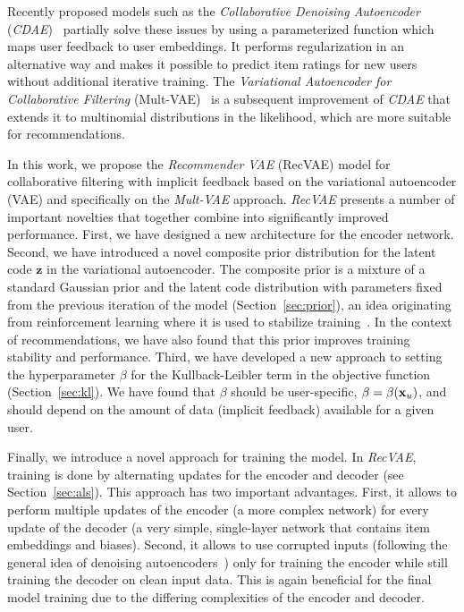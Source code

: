 \documentclass[sigconf,authorversion]{acmart}
\def\x{{\bf x}}
\def\bz{{\bf z}}
\def\bz{\boldsymbol{z}}
\begin{document}
Recently proposed models such as the \emph{Collaborative Denoising Autoencoder} (\emph{CDAE})~\cite{wu2016collaborative} partially solve these issues by using a parameterized function which maps user feedback to user embeddings. It performs regularization in an alternative way and makes it possible to predict item ratings for new users without additional iterative training. The \emph{Variational Autoencoder for Collaborative Filtering} (Mult-VAE)~\cite{liang2018variational} is a subsequent improvement of \emph{CDAE} that extends it to multinomial distributions in the likelihood, which are more suitable for recommendations.

In this work, we propose the \emph{Recommender VAE} (RecVAE) model for collaborative filtering with implicit feedback based on the variational autoencoder (VAE) and specifically on the \emph{Mult-VAE} approach. \emph{RecVAE} presents a number of important novelties that together combine into significantly improved performance. First, we have designed a new architecture for the encoder network. Second, we have introduced a novel composite prior distribution for the latent code $\bz$ in the variational autoencoder. The composite prior is a mixture of a standard Gaussian prior and the latent code distribution with parameters fixed from the previous iteration of the model (Section~\ref{sec:prior}), an idea originating from reinforcement learning where it is used to stabilize training~\cite{DBLP:journals/corr/SchulmanWDRK17,houthooft2016vime}. In the context of recommendations, we have also found that this prior improves training stability and performance. Third, we have developed a new approach to setting the hyperparameter $\beta$ for the Kullback-Leibler term in the objective function (Section~\ref{sec:kl}). We have found that $\beta$ should be user-specific, $\beta=\beta(\x_u)$, and should depend on the amount of data (implicit feedback) available for a given user.

Finally, we introduce a novel approach for training the model. In \emph{RecVAE}, training is done by alternating updates for the encoder and decoder (see Section~\ref{sec:als}). This approach has two important advantages. First, it allows to perform multiple updates of the encoder (a more complex network) for every update of the decoder (a very simple, single-layer network that contains item embeddings and biases). Second, it allows to use corrupted inputs (following the general idea of denoising autoencoders~\cite{im2017denoising,shu2018amortized}) only for training the encoder while still training the decoder on clean input data. This is again beneficial for the final model training due to the differing complexities of the encoder and decoder. 
\end{document}
